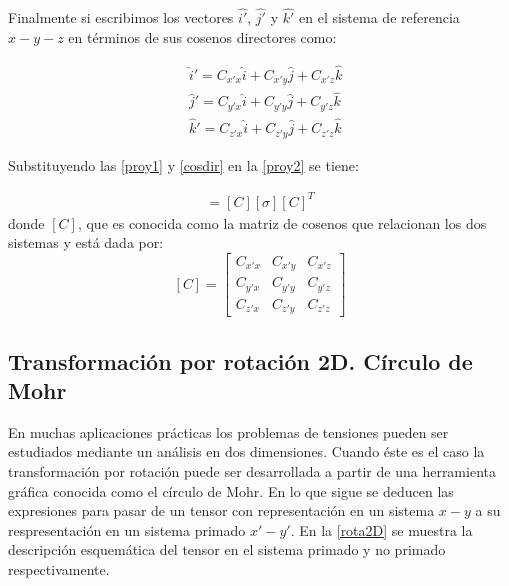 \documentclass[../notas medios.tex]{subfiles}
\begin{document}
%
Finalmente si escribimos los vectores $\hat{i'}$, $\hat{j'}$ y $\hat{k'}$ en el sistema de referencia $x-y-z$ en términos de sus cosenos directores como:

\begin{equation}
\begin{aligned}
&\hat i' = {C_{x'x}}\hat i + {C_{x'y}}\hat j + {C_{x'z}}\hat k \\
&\hat j' = {C_{y'x}}\hat i + {C_{y'y}}\hat j + {C_{y'z}}\hat k \\
&\hat k' = {C_{z'x}}\hat i + {C_{z'y}}\hat j + {C_{z'z}}\hat k
\end{aligned}
\label{cosdir}
\end{equation}

Substituyendo las \cref{proy1} y \cref{cosdir} en la \cref{proy2} se tiene:

%
\begin{align}
[\sigma'] = [C] [\sigma] {[C]^T}
\label{rotacion}
\end{align}
%
donde $[C]$,  que es conocida como la matriz de cosenos que relacionan los dos
sistemas y está dada por: \\
\[
[C]
= 
\begin{bmatrix}
    C_{x'x} & C_{x'y} & C_{x'z} \\
    C_{y'x} & C_{y'y} & C_{y'z} \\
    C_{z'x} & C_{z'y} & C_{z'z}
\end{bmatrix}
\]

\subsection{Transformación por rotación 2D. Círculo de Mohr}
%
En muchas aplicaciones prácticas los problemas de tensiones pueden ser estudiados mediante un análisis en dos dimensiones. Cuando éste es el caso la transformación por rotación puede ser desarrollada a partir de una herramienta gráfica conocida como el círculo de Mohr.  En lo que sigue se deducen las expresiones para pasar de un tensor con representación en un sistema $x-y$ a su respresentación en un sistema primado $x'-y'$. En la \cref{rota2D} se muestra la descripción esquemática del tensor en el sistema primado y no primado respectivamente. 
\end{document}
